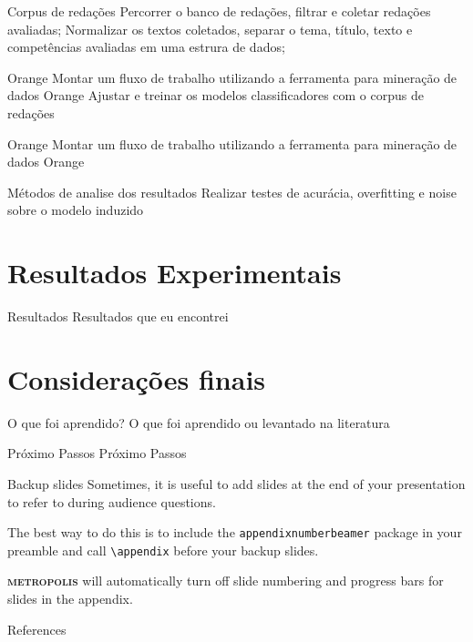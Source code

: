 \documentclass[10pt]{beamer}
\newcommand{\themename}{\textbf{\textsc{metropolis}}\xspace}
\begin{document}
\begin{frame}[fragile]{Corpus de redações}
Percorrer o banco de redações, filtrar e coletar redações avaliadas; 
Normalizar os textos coletados, separar o tema, título, texto e competências
avaliadas em uma estrura de dados;
\end{frame}

\begin{frame}[fragile]{Orange}
Montar um fluxo de trabalho utilizando a ferramenta para mineração de dados Orange
Ajustar e treinar os modelos classificadores com o corpus de redações
\end{frame}

\begin{frame}[fragile]{Orange}
Montar um fluxo de trabalho utilizando a ferramenta para mineração de dados Orange
\end{frame}

\begin{frame}[fragile]{Métodos de analise dos resultados}
Realizar testes de acurácia, overfitting e noise sobre o modelo induzido
\end{frame}

\section{Resultados Experimentais}

\begin{frame}[fragile]{Resultados}
Resultados que eu encontrei
\end{frame}

\section{Considerações finais}

\begin{frame}[fragile]{O que foi aprendido?}
O que foi aprendido ou levantado na literatura
\end{frame}

\begin{frame}[fragile]{Próximo Passos}
Próximo Passos
\end{frame}

\appendix

\begin{frame}[fragile]{Backup slides}
  Sometimes, it is useful to add slides at the end of your presentation to
  refer to during audience questions.

  The best way to do this is to include the \verb|appendixnumberbeamer|
  package in your preamble and call \verb|\appendix| before your backup slides.

  \themename will automatically turn off slide numbering and progress bars for
  slides in the appendix.
\end{frame}

\begin{frame}[allowframebreaks]{References}

  
  
\end{frame}
\end{document}
